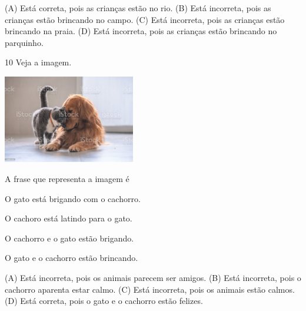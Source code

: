 
(A) Está correta, pois as crianças estão no rio.
(B) Está incorreta, pois as crianças estão brincando no campo.
(C) Está incorreta, pois as crianças estão brincando na praia.
(D) Está incorreta, pois as crianças estão brincando no parquinho.

\num{10} Veja a imagem.

\includegraphics[width=2.27539in,height=1.51515in]{media/image158.jpeg}


A frase que representa a imagem é

\begin{escolha}
\item O gato está brigando com o cachorro.

\item O cachoro está latindo para o gato.

\item O cachorro e o gato estão brigando.

\item O gato e o cachorro estão brincando.
\end{escolha}


(A) Está incorreta, pois os animais parecem ser amigos.
(B) Está incorreta, pois o cachorro aparenta estar calmo.
(C) Está incorreta, pois os animais estão calmos.
(D) Está correta, pois o gato e o cachorro estão felizes.

